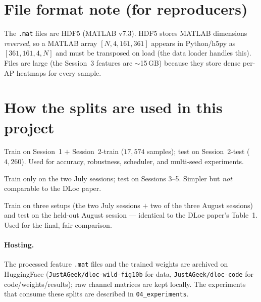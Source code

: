 \documentclass[11pt,a4paper]{article}
\begin{document}
\section{File format note (for reproducers)}

The \texttt{.mat} files are HDF5 (MATLAB v7.3). HDF5 stores MATLAB dimensions \emph{reversed}, so
a MATLAB array $[N,4,161,361]$ appears in Python/h5py as $[361,161,4,N]$ and must be transposed
on load (the data loader handles this). Files are large (the Session~3 features are $\sim$15\,GB)
because they store dense per-AP heatmaps for every sample.

\section{How the splits are used in this project}

\begin{description}[nosep,leftmargin=2.0cm,style=nextline]
  \item[Standard split (in-distribution)] Train on Session~1 $+$ Session~2-train
  ($17{,}574$ samples); test on Session~2-test ($4{,}260$). Used for accuracy, robustness,
  scheduler, and multi-seed experiments.
  \item[Initial cross-session (2-session)] Train only on the two July sessions; test on
  Sessions 3--5. Simpler but \emph{not} comparable to the DLoc paper.
  \item[Official cross-session (leave-one-session-out)] Train on three setups (the two July
  sessions $+$ two of the three August sessions) and test on the held-out August session ---
  identical to the DLoc paper's Table~1. Used for the final, fair comparison.
\end{description}

\paragraph{Hosting.} The processed feature \texttt{.mat} files and the trained weights are
archived on HuggingFace (\texttt{JustAGeek/dloc-wild-fig10b} for data,
\texttt{JustAGeek/dloc-code} for code/weights/results); raw channel matrices are kept locally.
The experiments that consume these splits are described in \texttt{04\_experiments}.
\end{document}
